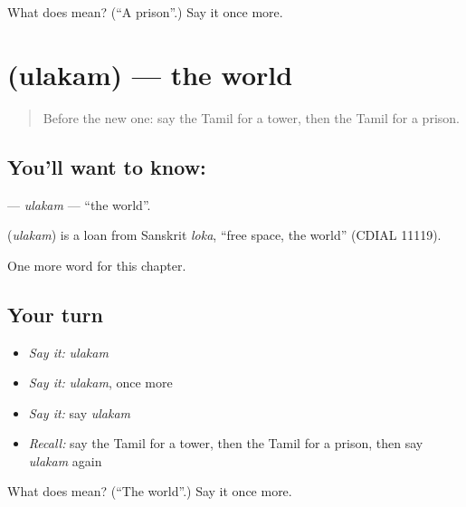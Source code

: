 \begin{tcolorbox}[breakable,colback=teal!4,colframe=teal!35!black,title={Before you move on}]
What does  mean? (\textquotedblleft{}A prison\textquotedblright{}.) Say it once more.
\end{tcolorbox}
\section[\texorpdfstring{\ta{உலகம்} (ulakam)}{உலகம் (ulakam)}]{ (ulakam) — the world}

\label{lesson:TA-C265-ulakam}



\begin{quote}
Before the new one: say the Tamil for a tower, then the Tamil for a prison.
\end{quote}

\subsection*{You'll want to know: }
\textbf{} — \emph{ulakam} — \textquotedblleft{}the world\textquotedblright{}.

\begin{cousinweb}
\textbf{} (\emph{ulakam}) is a loan from Sanskrit \emph{loka}, \textquotedblleft{}free space, the world\textquotedblright{} (CDIAL 11119).
\end{cousinweb}

\begin{grammarlens}[title={What you've built}]
One more word for this chapter.
\end{grammarlens}

\subsection*{Your turn}
\begin{itemize}
\raggedright
  \item \emph{Say it:} \emph{ulakam}
  \item \emph{Say it:} \emph{ulakam}, once more
  \item \emph{Say it:} say \emph{ulakam}
  \item \emph{Recall:} say the Tamil for a tower, then the Tamil for a prison, then say \emph{ulakam} again
\end{itemize}

\begin{tcolorbox}[breakable,colback=teal!4,colframe=teal!35!black,title={Before you move on}]
What does  mean? (\textquotedblleft{}The world\textquotedblright{}.) Say it once more.
\end{tcolorbox}
